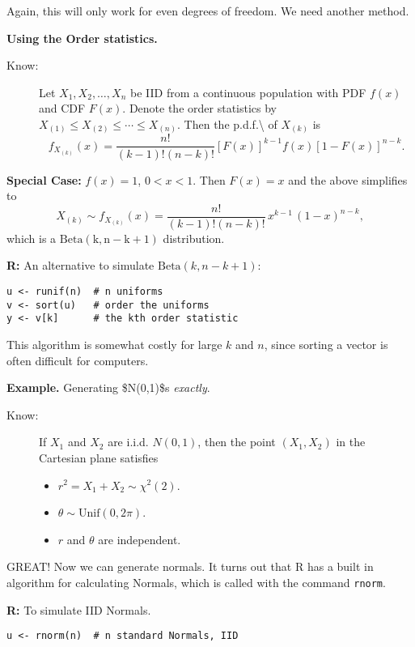 \documentclass[captions=tableheading]{scrbook}
\begin{document}
\begin{itemize}
Again, this will only work for even degrees of freedom. We need another method.

 


\textbf{Using the Order statistics.}


\begin{description}
\item[Know:] Let $X_{1},X_{2},\ldots,X_{n}$ be IID from a continuous population with PDF $f(x)$ and CDF $F(x)$. Denote the order statistics by $X_{(1)}\leq X_{(2)}\leq\cdots\leq X_{(n)}$. Then the p.d.f.\textbackslash{} of $X_{(k)}$ is 
  \[
  f_{X_{(k)}}(x)=\frac{n!}{(k-1)!(n-k)!}[F(x)]^{k-1}f(x)[1-F(x)]^{n-k}.
  \]
\end{description}
\textbf{Special Case:} $f(x)=1$, $0<x<1$.   Then $F(x)=x$ and the above simplifies to 
\[
X_{(k)}\sim f_{X_{(k)}}(x)=\frac{n!}{(k-1)!(n-k)!}\, x^{k-1}\,(1-x)^{n-k},
\]
which is a $\mathrm{Beta(k,n-k+1)}$ distribution.

\textbf{R:} An alternative to simulate $\mathrm{Beta}(k,n-k+1)$:

\begin{verbatim}
u <- runif(n)  # n uniforms
v <- sort(u)   # order the uniforms
y <- v[k]      # the kth order statistic
\end{verbatim}

This algorithm is somewhat costly for large $k$ and $n$, since sorting a vector is often difficult for computers.


\textbf{Example.} Generating \$N(0,1)\$s \emph{exactly}.


\begin{description}
\item[Know:] If $X_{1}$ and $X_{2}$ are i.i.d. $N(0,1)$, then the point $(X_{1},X_{2})$ in the Cartesian plane satisfies
\begin{itemize}
\item $r^{2}=X_{1}+X_{2}\sim\chi^{2}(2)$.
\item $\theta \sim \mathrm{Unif}(0,2\pi)$.
\item $r$ and $\theta$ are independent.
\end{itemize}
\end{description}

GREAT! Now we can generate normals. It turns out that R has a built in algorithm for calculating Normals, which is called with the command \texttt{rnorm}.

\textbf{R:} To simulate IID Normals.

\begin{verbatim}
u <- rnorm(n)  # n standard Normals, IID
\end{verbatim}



\end{itemize}
\end{document}
